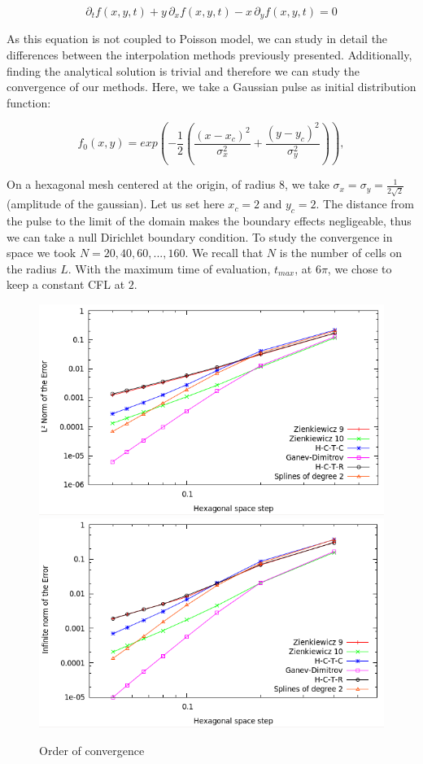 \documentclass[proc]{edpsmath}
\begin{document}
	\begin{equation}
		\partial_t f(x,y,t) + y\,\partial_x f(x,y,t) - x \,\partial_y f(x,y,t) = 0 
	\end{equation}

As this equation is not coupled to Poisson model, we can study in detail the differences between the interpolation methods previously presented.	Additionally, finding the analytical solution is trivial and therefore we can study the convergence of our methods. Here, we take a Gaussian pulse as initial distribution function:

	\begin{equation}
	 f_0(x,y) = exp  \left( -\dfrac{1}{2} \left( \dfrac{(x - x_c)^2}{\sigma_x^2} + \dfrac{(y - y_c)^2}{\sigma_y^2  } \right)   \right ), 
	\end{equation}

On a hexagonal mesh centered at the origin, of radius $8$,  we take  $\sigma_x = \sigma_y = \frac{1}{2\sqrt{2}}$ (amplitude of the gaussian). Let us set here $x_c = 2$ and $y_c = 2$. The distance from the pulse to the limit of the domain makes the boundary effects negligeable, thus we can take a null Dirichlet boundary condition.  To study the convergence in space we took $N = 20, 40, 60, ..., 160$. We recall that $N$ is the number of cells on the radius $L$. With the maximum time of evaluation, $t_{max}$, at $6 \pi$, we chose to keep a constant CFL at $2$.



\begin{figure}[h!]
	\label{fig:circ_convergence}
	\includegraphics[scale=0.35]{figures/l2.png}
	\includegraphics[scale=0.35]{figures/inf_l.png}
	\caption{Order of convergence}
\end{figure}
\end{document}

